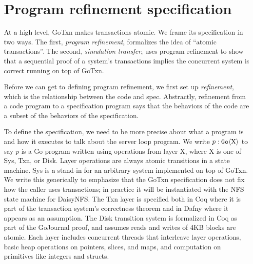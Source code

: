 \section{Program refinement specification}%
\label{sec:gotxn:spec}


\resume

At a high level, GoTxn makes transactions atomic. We frame its specification in
two ways. The first, \emph{program refinement}, formalizes the idea of ``atomic
transactions''. The second, \emph{simulation transfer}, uses
program refinement to show that a sequential proof of a system's transactions
implies the concurrent system is correct running on top of GoTxn.

Before we can get to defining program refinement, we first set up
\emph{refinement}, which is the relationship between the code and spec.
Abstractly, refinement from a code program to
a specification program says that the behaviors of the code are a subset of the
behaviors of the specification.

To define the specification, we need to be more precise about what a program is
and how it executes to talk about the server loop program. We
write $p : \mathtt{Go}\langle \mathrm{X} \rangle$ to say $p$ is a Go program written using operations
from layer X, where X is one of Sys, Txn, or Disk.
Layer operations are always atomic transitions in a state machine. Sys is a
stand-in for an arbitrary system implemented on top of GoTxn. We write this
generically to emphasize that the GoTxn specification does not fix how the
caller uses transactions; in practice it will be instantiated with the NFS state
machine for DaisyNFS.
The Txn layer is specified both in Coq where it is part of the transaction
system's correctness theorem and in Dafny where it appears as an assumption. The
Disk transition system is formalized in Coq as part of the GoJournal proof,
and assumes reads and writes of 4KB blocks are atomic. Each layer
includes concurrent threads that interleave layer
operations, basic heap operations on pointers, slices, and maps, and computation
on primitives like integers and structs.

